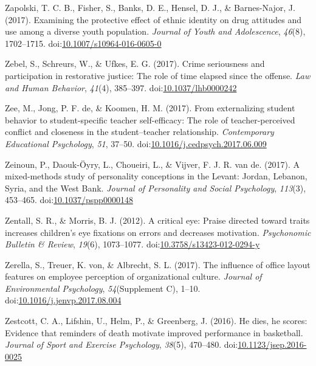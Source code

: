 \documentclass[english,man]{apa6}
\begin{document}
\hypertarget{ref-Zapolski2017}{}
Zapolski, T. C. B., Fisher, S., Banks, D. E., Hensel, D. J., \&
Barnes-Najor, J. (2017). Examining the protective effect of ethnic
identity on drug attitudes and use among a diverse youth population.
\emph{Journal of Youth and Adolescence}, \emph{46}(8), 1702--1715.
doi:\href{https://doi.org/10.1007/s10964-016-0605-0}{10.1007/s10964-016-0605-0}

\hypertarget{ref-Zebel2017}{}
Zebel, S., Schreurs, W., \& Ufkes, E. G. (2017). Crime seriousness and
participation in restorative justice: The role of time elapsed since the
offense. \emph{Law and Human Behavior}, \emph{41}(4), 385--397.
doi:\href{https://doi.org/10.1037/lhb0000242}{10.1037/lhb0000242}

\hypertarget{ref-Zee2017}{}
Zee, M., Jong, P. F. de, \& Koomen, H. M. (2017). From externalizing
student behavior to student-specific teacher self-efficacy: The role of
teacher-perceived conflict and closeness in the student--teacher
relationship. \emph{Contemporary Educational Psychology}, \emph{51},
37--50.
doi:\href{https://doi.org/10.1016/j.cedpsych.2017.06.009}{10.1016/j.cedpsych.2017.06.009}

\hypertarget{ref-Zeinoun2017}{}
Zeinoun, P., Daouk-Öyry, L., Choueiri, L., \& Vijver, F. J. R. van de.
(2017). A mixed-methods study of personality conceptions in the Levant:
Jordan, Lebanon, Syria, and the West Bank. \emph{Journal of Personality
and Social Psychology}, \emph{113}(3), 453--465.
doi:\href{https://doi.org/10.1037/pspp0000148}{10.1037/pspp0000148}

\hypertarget{ref-Zentall2012}{}
Zentall, S. R., \& Morris, B. J. (2012). A critical eye: Praise directed
toward traits increases children's eye fixations on errors and decreases
motivation. \emph{Psychonomic Bulletin \& Review}, \emph{19}(6),
1073--1077.
doi:\href{https://doi.org/10.3758/s13423-012-0294-y}{10.3758/s13423-012-0294-y}

\hypertarget{ref-Zerella2017}{}
Zerella, S., Treuer, K. von, \& Albrecht, S. L. (2017). The influence of
office layout features on employee perception of organizational culture.
\emph{Journal of Environmental Psychology}, \emph{54}(Supplement C),
1--10.
doi:\href{https://doi.org/10.1016/j.jenvp.2017.08.004}{10.1016/j.jenvp.2017.08.004}

\hypertarget{ref-Zestcott2016}{}
Zestcott, C. A., Lifshin, U., Helm, P., \& Greenberg, J. (2016). He
dies, he scores: Evidence that reminders of death motivate improved
performance in basketball. \emph{Journal of Sport and Exercise
Psychology}, \emph{38}(5), 470--480.
doi:\href{https://doi.org/10.1123/jsep.2016-0025}{10.1123/jsep.2016-0025}
\end{document}
